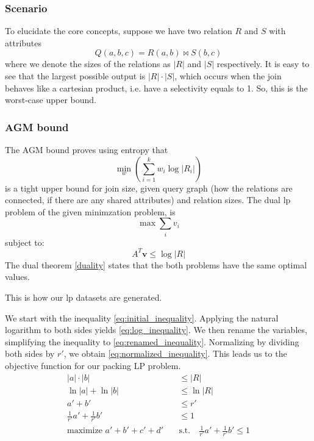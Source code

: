 \subsubsection{Scenario}
To elucidate the core concepts,
suppose we have two relation $R$ and $S$ with attributes 
\[
    Q(a, b, c) = R(a, b) \Join S(b, c)
\]
where we denote the sizes of the relations as
$|R|$ and $|S|$ respectively.
It is easy to see that the largest possible output is $|R| \cdot |S|$, which occurs when the join
behaves like a cartesian product, i.e. have a selectivity equals to 1. So, this is the worst-case
upper bound.
\subsubsection{AGM bound}
The AGM bound \parencite{atserias2013size} proves
using entropy that \[ \min_w \left( \sum_{i=1}^{k} w_i \log |R_i| \right) \]
is a tight upper bound for join size, given query graph (how the
relations are connected, if there are any shared attributes)
and relation sizes.
The dual \gls{lp} problem of the given minimzation problem, is
\[ \max \sum_{i} v_i \]
subject to:
\[ A^T \mathbf{v} \leq \log |R| \]
The dual theorem \ref{duality} states that the both problems have the same 
optimal values. 

This is how our \gls{lp} datasets are generated.

We start with the inequality \ref{eq:initial_inequality}. Applying the natural logarithm to both sides yields \ref{eq:log_inequality}. We then rename the variables, simplifying the inequality to \ref{eq:renamed_inequality}.
Normalizing by dividing both sides by \(r'\), we obtain \ref{eq:normalized_inequality}. This leads us to the objective function for our packing LP problem.
\begin{align}
    |a| \cdot |b|                            & \leq |R| \label{eq:initial_inequality}                                                   \\
    \ln|a| + \ln|b|                          & \leq \ln|R| \label{eq:log_inequality}                                                    \\
    a' + b'                                  & \leq r' \label{eq:renamed_inequality}                                                    \\
    \frac{1}{r'} a' + \frac{1}{r'} b'        & \leq 1 \label{eq:normalized_inequality}                                                  \\
    \text{maximize } a' + b' + c' + d' \quad & \text{s.t.} \quad \frac{1}{r'} a' + \frac{1}{r'} b' \leq 1 \label{eq:objective_function}
\end{align}

